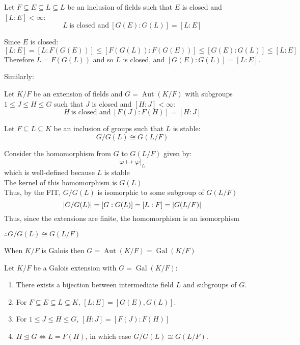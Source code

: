 \documentclass[letterpaper,12pt,fleqn]{article}
\newcommand{\p}{\varphi}
\newcommand{\rest}[2]{\left.#1\right|_{#2}}
\newcommand{\n}{\trianglelefteq}
\DeclareMathOperator{\Aut}{Aut}
\DeclareMathOperator{\Gal}{Gal}
\begin{document}
\begin{theorem}
  Let $F\subseteq E\subseteq L\subseteq L$ be an inclusion of fields such that
  $E$ is closed and $[L:E]<\infty$:
  \[L\ \mbox{is closed and}\ [G(E):G(L)]=[L:E]\]
\end{theorem}

\newpage

\begin{theproof}
  Since $E$ is closed:
  \[[L:E]=[L:F(G(E))]\le[F(G(L)):F(G(E))]\le[G(E):G(L)]\le[L:E]\]
  Therefore $L=F(G(L))$ and so $L$ is closed, and $[G(E):G(L)]=[L:E]$.
\end{theproof}

Similarly:

\begin{theorem}
  Let $K/F$ be an extension of fields and $G=\Aut(K/F)$ with subgroups
  $1\le J\le H\le G$ such that $J$ is closed and $[H:J]<\infty$:
  \[H\ \mbox{is closed and}\ [F(J):F(H)]=[H:J]\]
\end{theorem}

\begin{theorem}
  Let $F\subseteq L\subseteq K$ be an inclusion of groups such that $L$ is
  stable:
  \[G/G(L)\cong G(L/F)\]
\end{theorem}

\begin{theproof}
  Consider the homomorphism from $G$ to $G(L/F)$ given by:
  \[\p\mapsto\rest{\p}{L}\]
  which is well-defined because $L$ is stable \\
  The kernel of this homomorphism is $G(L)$ \\
  Thus, by the FIT, $G/G(L)$ is isomorphic to some subgroup of $G(L/F)$ \\
  \[\lvert G/G(L)\rvert=[G:G(L)]=[L:F]=\lvert G(L/F)\rvert\]
  Thus, since the extensions are finite, the homomorphism is an isomorphism

  $\therefore G/G(L)\cong G(L/F)$
\end{theproof}

\begin{notation}
  When $K/F$ is Galois then $G=\Aut(K/F)=\Gal(K/F)$
\end{notation}

\begin{theorem}
  Let $K/F$ be a Galois extension with $G=\Gal(K/F)$:
  \begin{enumerate}
  \item There exists a bijection between intermediate field $L$ and subgroups
    of $G$.
  \item For $F\subseteq E\subseteq L\subseteq K$, $[L:E]=[G(E),G(L)]$.
  \item For $1\le J\le H\le G$, $[H:J]=[F(J):F(H)]$
  \item $H\n G\iff L=F(H)$, in which case $G/G(L)\cong G(L/F)$.
  \end{enumerate}
\end{theorem}
\end{document}
